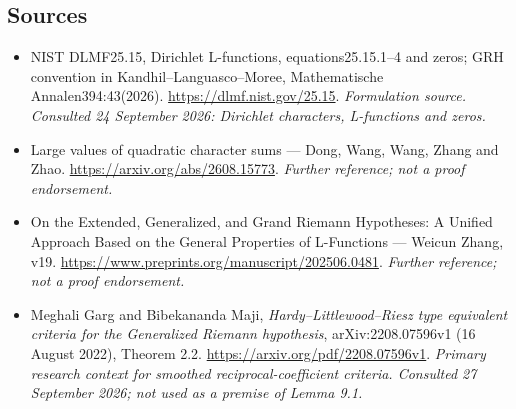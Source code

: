 \documentclass[11pt]{article}
\begin{document}
\subsection{Sources}
\begin{itemize}
\item[S1]NIST DLMF25.15, Dirichlet L-functions, equations25.15.1–4 and zeros; GRH convention in Kandhil–Languasco–Moree, Mathematische Annalen394:43(2026).
\url{https://dlmf.nist.gov/25.15}.
\textit{Formulation source. Consulted 24 September 2026: Dirichlet characters, L-functions and zeros.}
\item[S2]Large values of quadratic character sums — Dong, Wang, Wang, Zhang and Zhao.
\url{https://arxiv.org/abs/2608.15773}.
\textit{Further reference; not a proof endorsement.}
\item[S3]On the Extended, Generalized, and Grand Riemann Hypotheses: A Unified Approach Based on the General Properties of L-Functions — Weicun Zhang, v19.
\url{https://www.preprints.org/manuscript/202506.0481}.
\textit{Further reference; not a proof endorsement.}

\item[E1]Meghali Garg and Bibekananda Maji,
\emph{Hardy--Littlewood--Riesz type equivalent criteria for the Generalized
Riemann hypothesis}, arXiv:2208.07596v1 (16 August 2022), Theorem 2.2.
\url{https://arxiv.org/pdf/2208.07596v1}.
\textit{Primary research context for smoothed reciprocal-coefficient criteria.
Consulted 27 September 2026; not used as a premise of Lemma 9.1.}
\end{itemize}
\end{document}
